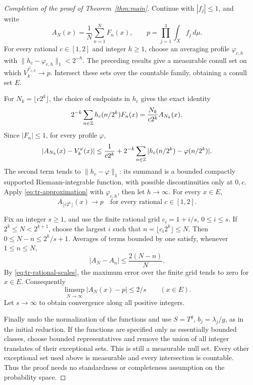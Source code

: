 \begin{proof}[Completion of the proof of Theorem~\ref{thm:main}]
Continue with \(|f_j|\leq1\), and write
\[
 A_N(x)=\frac1N\sum_{n=1}^NF_n(x),
 \qquad p=\prod_{j=1}^3\int_Xf_j\,d\mu.
\]
For every rational \(c\in[1,2]\) and integer \(h\geq1\), choose
an averaging profile \(\varphi_{c,h}\) with
\(\|h_c-\varphi_{c,h}\|_1<2^{-h}\).  The preceding results give
a measurable conull set on which \(V_k^{\varphi_{c,h}}\to p\).
Intersect these sets over the countable family, obtaining a conull
set \(E\).

For \(N_k=\lfloor c2^k\rfloor\), the choice of endpoints in
\(h_c\) gives the exact identity
\[
 2^{-k}\sum_{n\in\mathbb Z}h_c(n/2^k)F_n(x)
 =\frac{N_k}{c2^k}A_{N_k}(x).
\]
Since \(|F_n|\leq1\), for every profile \(\varphi\),
\begin{equation}
 |A_{N_k}(x)-V_k^\varphi(x)|
 \leq\frac1{c2^k}
      +2^{-k}\sum_{n\in\mathbb Z}|h_c(n/2^k)-\varphi(n/2^k)|.
 \label{eq:tr-approximation}
\end{equation}
The second term tends to \(\|h_c-\varphi\|_1\): its summand is
a bounded compactly supported Riemann-integrable function, with
possible discontinuities only at \(0,c\).  Apply
\eqref{eq:tr-approximation} with \(\varphi_{c,h}\), then let
\(h\to\infty\).  For every \(x\in E\),
\begin{equation}
 A_{\lfloor c2^k\rfloor}(x)\longrightarrow p
 \quad\text{for every rational }c\in[1,2].
 \label{eq:tr-rational-scales}
\end{equation}

Fix an integer \(s\geq1\), and use the finite rational grid
\(c_i=1+i/s\), \(0\leq i\leq s\).  If
\(2^k\leq N<2^{k+1}\), choose the largest \(i\) such that
\(n=\lfloor c_i2^k\rfloor\leq N\).  Then
\(0\leq N-n\leq2^k/s+1\).  Averages of terms bounded by one
satisfy, whenever \(1\leq n\leq N\),
\[
 |A_N-A_n|\leq\frac{2(N-n)}{N}.
\]
By \eqref{eq:tr-rational-scales}, the maximum error over the finite
grid tends to zero for \(x\in E\).  Consequently
\[
 \limsup_{N\to\infty}|A_N(x)-p|\leq2/s\qquad(x\in E).
\]
Let \(s\to\infty\) to obtain convergence along all positive integers.

Finally undo the normalization of the functions and use
\(S=T^g\), \(b_j=\lambda_j/g\), as in the initial reduction.
If the functions are specified only as essentially bounded classes,
choose bounded representatives and remove the union of all integer
translates of their exceptional sets.  This is still a measurable
null set.  Every other exceptional set used above is measurable and
every intersection is countable.  Thus the proof needs no standardness
or completeness assumption on the probability space.
\end{proof}
